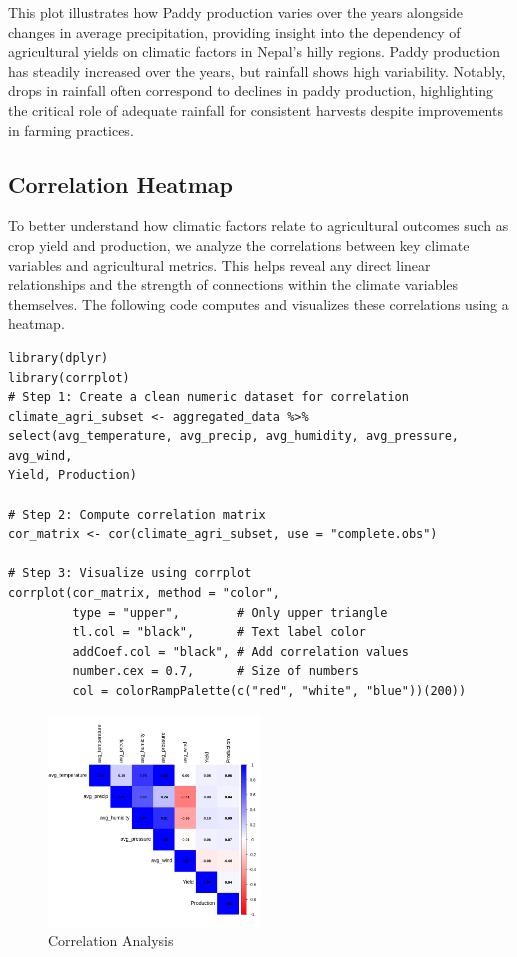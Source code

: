 This plot illustrates how Paddy production varies over the years alongside changes in average precipitation, providing insight into the dependency of agricultural yields on climatic factors in Nepal’s hilly regions. Paddy production has steadily increased over the years, but rainfall shows high variability. Notably, drops in rainfall often correspond to declines in paddy production, highlighting the critical role of adequate rainfall for consistent harvests despite improvements in farming practices.

\subsection*{Correlation Heatmap}

To better understand how climatic factors relate to agricultural outcomes such as crop yield and production, we analyze the correlations between key climate variables and agricultural metrics. This helps reveal any direct linear relationships and the strength of connections within the climate variables themselves. The following code computes and visualizes these correlations using a heatmap.

\begin{verbatim}
library(dplyr)
library(corrplot)
# Step 1: Create a clean numeric dataset for correlation
climate_agri_subset <- aggregated_data %>%
select(avg_temperature, avg_precip, avg_humidity, avg_pressure, avg_wind,
Yield, Production)

# Step 2: Compute correlation matrix
cor_matrix <- cor(climate_agri_subset, use = "complete.obs")

# Step 3: Visualize using corrplot
corrplot(cor_matrix, method = "color",
         type = "upper",        # Only upper triangle
         tl.col = "black",      # Text label color
         addCoef.col = "black", # Add correlation values
         number.cex = 0.7,      # Size of numbers
         col = colorRampPalette(c("red", "white", "blue"))(200))
\end{verbatim}

\begin{figure}[h]
\centering
\includegraphics[width=0.5\textwidth]{figures/corr_agri.png}
\caption{Correlation Analysis}
\end{figure}

